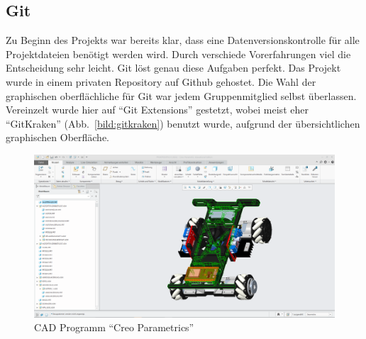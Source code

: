 \subsection{Git}
Zu Beginn des Projekts war bereits klar, dass eine Datenversionskontrolle für alle Projektdateien benötigt werden wird.
Durch verschiede Vorerfahrungen viel die Entscheidung sehr leicht. Git löst genau diese Aufgaben perfekt. Das Projekt wurde in einem privaten Repository auf Github gehostet. 
Die Wahl der graphischen oberflächliche für Git war jedem Gruppenmitglied selbst überlassen. Vereinzelt wurde hier auf ``Git Extensions'' gestetzt, wobei meist eher ``GitKraken'' (Abb.~\ref{bild:gitkraken}) benutzt wurde, aufgrund der übersichtlichen graphischen Oberfläche.
\begin{figure}[!ht]
	\centering
	\includegraphics[width=\textwidth]{bilder/CreoParametrics.png}
	\caption{CAD Programm ``Creo Parametrics''}
	\label{bild:creo}
\end{figure}

